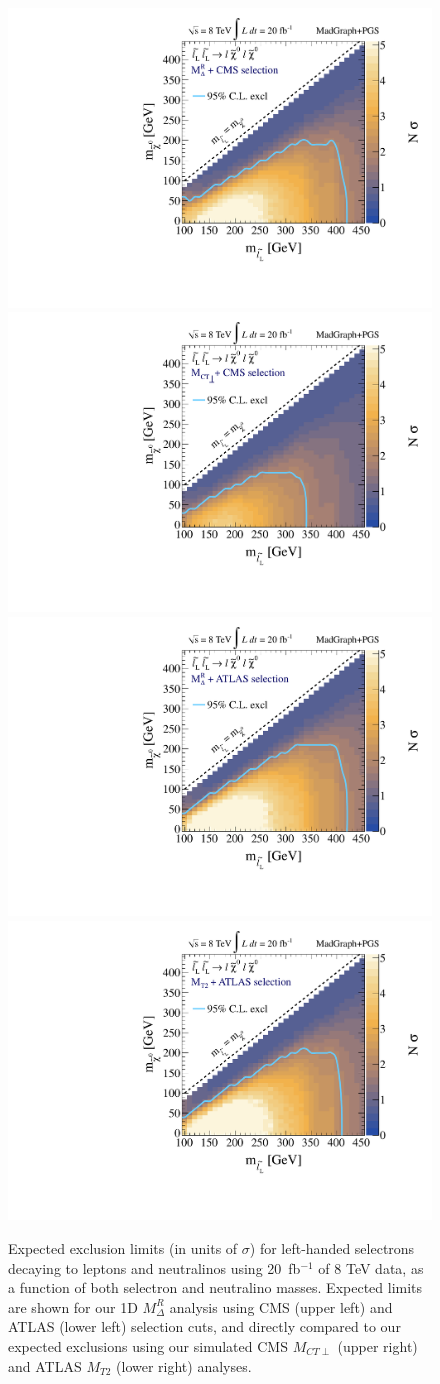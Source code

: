 \begin{figure}[ht]
\includegraphics[width=0.4\columnwidth]{fig/sectionV/LIMIT2D_selectronL_CMS_Mdelta.pdf}
\includegraphics[width=0.4\columnwidth]{fig/sectionV/LIMIT2D_selectronL_CMS_MCTperp.pdf}
\includegraphics[width=0.4\columnwidth]{fig/sectionV/LIMIT2D_selectronL_ATLAS_Mdelta.pdf}
\includegraphics[width=0.4\columnwidth]{fig/sectionV/LIMIT2D_selectronL_ATLAS_MT2.pdf}
\caption{Expected exclusion limits (in units of $\sigma$) for left-handed selectrons decaying to leptons and neutralinos using 20~fb$^{-1}$ of 8 TeV data, as a function of both selectron and neutralino masses. Expected limits are shown for our 1D $M_\Delta^R$ analysis using CMS (upper left) and ATLAS (lower left) selection cuts, and directly compared to our expected exclusions using our simulated CMS $M_{CT\perp}$ (upper right) and ATLAS $M_{T2}$ (lower right) analyses. \label{fig:results_slepton_2D_compare}}
\end{figure}

